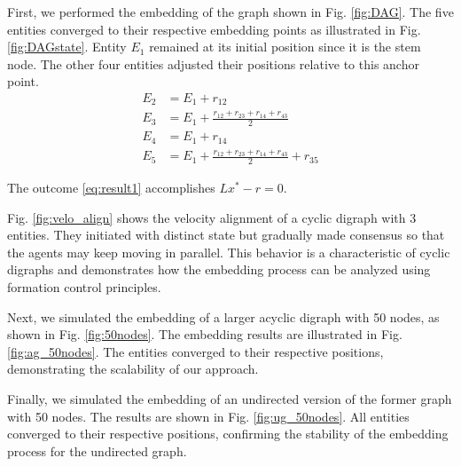 \documentclass[letterpaper, 10 pt, conference]{ieeeconf}  %
\begin{document}
First, we performed the embedding of the graph shown in Fig. \ref{fig:DAG}. The five entities converged to their respective embedding points as illustrated in Fig. \ref{fig:DAGstate}. Entity \(E_1\) remained at its initial position since it is the stem node. The other four entities adjusted their positions relative to this anchor point.
\begin{equation}\label{eq:result1}
\begin{split}
    E_2 &= E_1 + r_{12}\\
    E_3 &= E_1 + \frac{r_{12}+r_{23}+r_{14}+r_{43}}{2}\\
    E_4 &= E_1 + r_{14}\\
    E_5 &= E_1 + \frac{r_{12}+r_{23}+r_{14}+r_{43}}{2} + r_{35}
\end{split}
\end{equation}



\noindent The outcome \eqref{eq:result1} accomplishes \(Lx^* - r = 0\). 



Fig. \ref{fig:velo_align} shows the velocity alignment of a cyclic digraph with 3 entities. They initiated with distinct state but gradually made consensus so that the agents may keep moving in parallel. This behavior is a characteristic of cyclic digraphs and demonstrates how the embedding process can be analyzed using formation control principles.

Next, we simulated the embedding of a larger acyclic digraph with 50 nodes, as shown in Fig. \ref{fig:50nodes}. The embedding results are illustrated in Fig. \ref{fig:ag_50nodes}. The entities converged to their respective positions, demonstrating the scalability of our approach.

Finally, we simulated the embedding of an undirected version of the former graph with 50 nodes. The results are shown in Fig. \ref{fig:ug_50nodes}. All entities converged to their respective positions, confirming the stability of the embedding process for the undirected graph.
\end{document}
